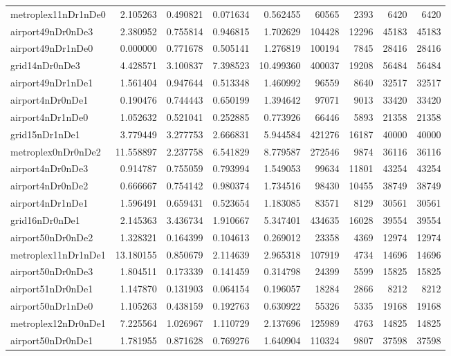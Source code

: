 \begin{longtable}{|l|r|r|r|r|r|r|r|r|}
metroplex11nDr1nDe0 & 2.105263 & 0.490821 & 0.071634 & 0.562455 & 60565 & 2393 & 6420 & 6420 \\
airport49nDr0nDe3 & 2.380952 & 0.755814 & 0.946815 & 1.702629 & 104428 & 12296 & 45183 & 45183 \\
airport49nDr1nDe0 & 0.000000 & 0.771678 & 0.505141 & 1.276819 & 100194 & 7845 & 28416 & 28416 \\
grid14nDr0nDe3 & 4.428571 & 3.100837 & 7.398523 & 10.499360 & 400037 & 19208 & 56484 & 56484 \\
airport49nDr1nDe1 & 1.561404 & 0.947644 & 0.513348 & 1.460992 & 96559 & 8640 & 32517 & 32517 \\
airport4nDr0nDe1 & 0.190476 & 0.744443 & 0.650199 & 1.394642 & 97071 & 9013 & 33420 & 33420 \\
airport4nDr1nDe0 & 1.052632 & 0.521041 & 0.252885 & 0.773926 & 66446 & 5893 & 21358 & 21358 \\
grid15nDr1nDe1 & 3.779449 & 3.277753 & 2.666831 & 5.944584 & 421276 & 16187 & 40000 & 40000 \\
metroplex0nDr0nDe2 & 11.558897 & 2.237758 & 6.541829 & 8.779587 & 272546 & 9874 & 36116 & 36116 \\
airport4nDr0nDe3 & 0.914787 & 0.755059 & 0.793994 & 1.549053 & 99634 & 11801 & 43254 & 43254 \\
airport4nDr0nDe2 & 0.666667 & 0.754142 & 0.980374 & 1.734516 & 98430 & 10455 & 38749 & 38749 \\
airport4nDr1nDe1 & 1.596491 & 0.659431 & 0.523654 & 1.183085 & 83571 & 8129 & 30561 & 30561 \\
grid16nDr0nDe1 & 2.145363 & 3.436734 & 1.910667 & 5.347401 & 434635 & 16028 & 39554 & 39554 \\
airport50nDr0nDe2 & 1.328321 & 0.164399 & 0.104613 & 0.269012 & 23358 & 4369 & 12974 & 12974 \\
metroplex11nDr1nDe1 & 13.180155 & 0.850679 & 2.114639 & 2.965318 & 107919 & 4734 & 14696 & 14696 \\
airport50nDr0nDe3 & 1.804511 & 0.173339 & 0.141459 & 0.314798 & 24399 & 5599 & 15825 & 15825 \\
airport51nDr0nDe1 & 1.147870 & 0.131903 & 0.064154 & 0.196057 & 18284 & 2866 & 8212 & 8212 \\
airport50nDr1nDe0 & 1.105263 & 0.438159 & 0.192763 & 0.630922 & 55326 & 5335 & 19168 & 19168 \\
metroplex12nDr0nDe1 & 7.225564 & 1.026967 & 1.110729 & 2.137696 & 125989 & 4763 & 14825 & 14825 \\
airport50nDr0nDe1 & 1.781955 & 0.871628 & 0.769276 & 1.640904 & 110324 & 9807 & 37598 & 37598 \\

\end{longtable}
